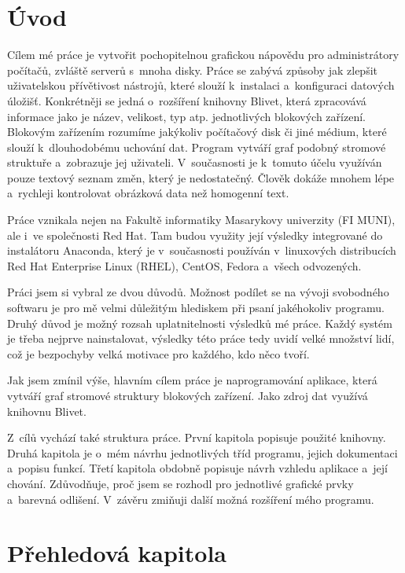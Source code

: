\documentclass[color,table,oneside,nolot,nolof]{fithesis}
\begin{document}
\chapter{Úvod}
	Cílem mé  práce je vytvořit pochopitelnou grafickou nápovědu pro administrátory počítačů, zvláště serverů s~mnoha disky. Práce se zabývá 
	způsoby jak zlepšit uživatelskou přívětivost nástrojů, které slouží k~instalaci a~konfiguraci datových úložišť.
	Konkrétněji se jedná o~rozšíření knihovny Blivet\cite{blivet}, která zpracovává informace jako je název, velikost, typ atp.
	jednotlivých blokových zařízení. Blokovým zařízením rozumíme jakýkoliv počítačový disk či jiné médium, které slouží k~dlouhodobému uchování dat.
	Program vytváří graf podobný stromové struktuře a~zobrazuje jej uživateli.  V~současnosti je k~tomuto účelu využíván pouze textový 
	seznam změn, který je nedostatečný. Člověk dokáže mnohem lépe a~rychleji kontrolovat obrázková data než homogenní text. 
	
	Práce vznikala nejen na Fakultě informatiky Masarykovy univerzity (FI MUNI), ale i~ve společnosti Red Hat. Tam budou využity její výsledky
	integrované do instalátoru Anaconda, který je v~současnosti používán v~linuxových distribucích Red Hat Enterprise Linux (RHEL), CentOS, Fedora a~všech
	odvozených\cite{anaconda-rhel}.

	Práci jsem si vybral ze dvou důvodů.  Možnost podílet se na vývoji svobodného softwaru je pro mě velmi důležitým hlediskem 
	při psaní jakéhokoliv programu. Druhý důvod je možný rozsah uplatnitelnosti výsledků mé práce. Každý systém je třeba nejprve nainstalovat, výsledky
	této práce tedy uvidí velké množství lidí, což je bezpochyby velká motivace pro každého, kdo něco tvoří. 

	Jak jsem zmínil výše, hlavním cílem práce je naprogramování aplikace, která vytváří graf stromové struktury blokových zařízení. Jako zdroj dat
	využívá knihovnu Blivet.  

	Z~cílů vychází také struktura práce. První kapitola popisuje použité knihovny.  
	Druhá kapitola je o~mém návrhu jednotlivých tříd programu, jejich dokumentaci a~popisu funkcí. 
	Třetí kapitola obdobně popisuje návrh vzhledu aplikace a~její chování. Zdůvodňuje, proč jsem se rozhodl pro jednotlivé grafické prvky a~barevná odlišení.
	V~závěru zmiňuji další možná rozšíření mého programu. 

\chapter{Přehledová kapitola}
\end{document}
